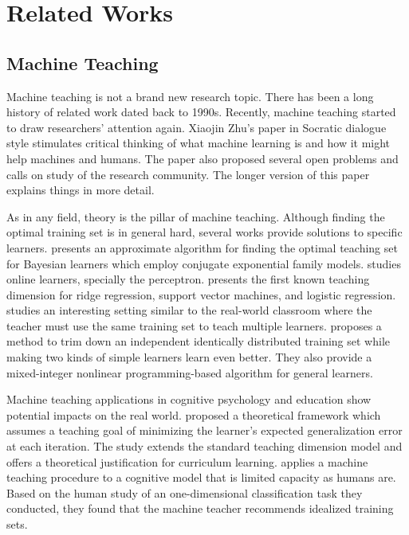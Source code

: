 
\chapter{Related Works}
\label{chap:related}

\section{Machine Teaching}

    Machine teaching is not a brand new research topic.
    There has been a long history of related work dated back to 1990s.
    Recently, machine teaching started to draw researchers' attention again.
    Xiaojin Zhu's paper in Socratic dialogue style \cite{Zhu2015} stimulates critical thinking of
    what machine learning is and how it might help machines and humans.
    The paper also proposed several open problems and calls on study of the research community.
    The longer version \cite{Zhu2018} of this paper explains things in more detail.

    As in any field, theory is the pillar of machine teaching.
    Although finding the optimal training set is in general hard,
    several works provide solutions to specific learners.
    \textcite{zhu2013machine} presents an approximate algorithm for finding the optimal teaching set
    for Bayesian learners which employ conjugate exponential family models.
    \textcite{xuezhou_zhang_optimal_2016} studies online learners, specially the perceptron.
    \textcite{liu2016teaching} presents the first known teaching dimension for ridge regression,
    support vector machines, and logistic regression.
    \textcite{zhu2017no} studies an interesting setting similar to the real-world classroom
    where the teacher must use the same training set to teach multiple learners.
    \textcite{ma2018teacher} proposes a method to trim down an independent identically distributed training set
    while making two kinds of simple learners learn even better.
    They also provide a mixed-integer nonlinear programming-based algorithm for general learners.

    Machine teaching applications in cognitive psychology and education show potential impacts on the real world.
    \textcite{khan2011humans} proposed a theoretical framework which assumes a teaching goal of
    minimizing the learner's expected generalization error at each iteration.
    The study extends the standard teaching dimension model and
    offers a theoretical justification for curriculum learning.
    \textcite{Patil2014} applies a machine teaching procedure
    to a cognitive model that is limited capacity as humans are.
    Based on the human study of an one-dimensional classification task they conducted,
    they found that the machine teacher recommends idealized training sets.

